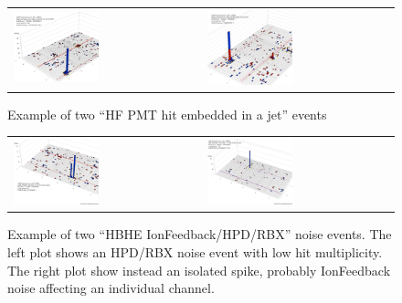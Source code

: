 %
\begin{figure}[h]
 \centering
 \begin{tabular}{ll}
   \includegraphics[width=0.47\textwidth]{fig//HFhitInJet.eps} & 
   \includegraphics[width=0.47\textwidth]{fig//HFhitInJet_1.eps} \\
 \end{tabular}
\caption{Example of two ``HF PMT hit embedded in a jet'' events}
\label{fig:HFhitEmbeddedInJet}
\end{figure}

%
\begin{figure}[h]
 \centering
 \begin{tabular}{ll}
   \includegraphics[width=0.47\textwidth]{fig/HBHEnoise_lowMult.eps} &
   \includegraphics[width=0.47\textwidth]{fig/HBHEnoise_spike.eps} \\
 \end{tabular}
\caption{Example of two ``HBHE IonFeedback/HPD/RBX'' noise events. 
The left plot shows an HPD/RBX noise event with low hit multiplicity. 
The right plot show instead an isolated spike, 
probably IonFeedback noise affecting an individual channel.}
\label{fig:HBHEnoise}
\end{figure}

